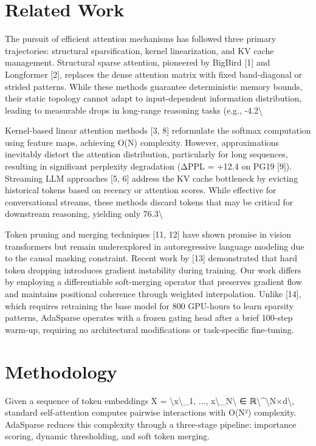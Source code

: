 \documentclass[11pt,a4paper]{article}
\begin{document}
\section{Related Work}
The pursuit of efficient attention mechanisms has followed three primary trajectories: structural sparsification, kernel linearization, and KV cache management. Structural sparse attention, pioneered by BigBird [1] and Longformer [2], replaces the dense attention matrix with fixed band-diagonal or strided patterns. While these methods guarantee deterministic memory bounds, their static topology cannot adapt to input-dependent information distribution, leading to measurable drops in long-range reasoning tasks (e.g., -4.2\textbackslash{}%

Kernel-based linear attention methods [3, 8] reformulate the softmax computation using feature maps, achieving O(N) complexity. However, approximations inevitably distort the attention distribution, particularly for long sequences, resulting in significant perplexity degradation (ΔPPL = +12.4 on PG19 [9]). Streaming LLM approaches [5, 6] address the KV cache bottleneck by evicting historical tokens based on recency or attention scores. While effective for conversational streams, these methods discard tokens that may be critical for downstream reasoning, yielding only 76.3\textbackslash{}%

Token pruning and merging techniques [11, 12] have shown promise in vision transformers but remain underexplored in autoregressive language modeling due to the causal masking constraint. Recent work by [13] demonstrated that hard token dropping introduces gradient instability during training. Our work differs by employing a differentiable soft-merging operator that preserves gradient flow and maintains positional coherence through weighted interpolation. Unlike [14], which requires retraining the base model for 800 GPU-hours to learn sparsity patterns, AdaSparse operates with a frozen gating head after a brief 100-step warm-up, requiring no architectural modifications or task-specific fine-tuning.

\section{Methodology}
Given a sequence of token embeddings X = \textbackslash{}{x\textbackslash{}_1, ..., x\textbackslash{}_N\textbackslash{}} ∈ ℝ\textbackslash{}^{}\textbackslash{}{N×d\textbackslash{}}, standard self-attention computes pairwise interactions with O(N²) complexity. AdaSparse reduces this complexity through a three-stage pipeline: importance scoring, dynamic thresholding, and soft token merging.
\end{document}
